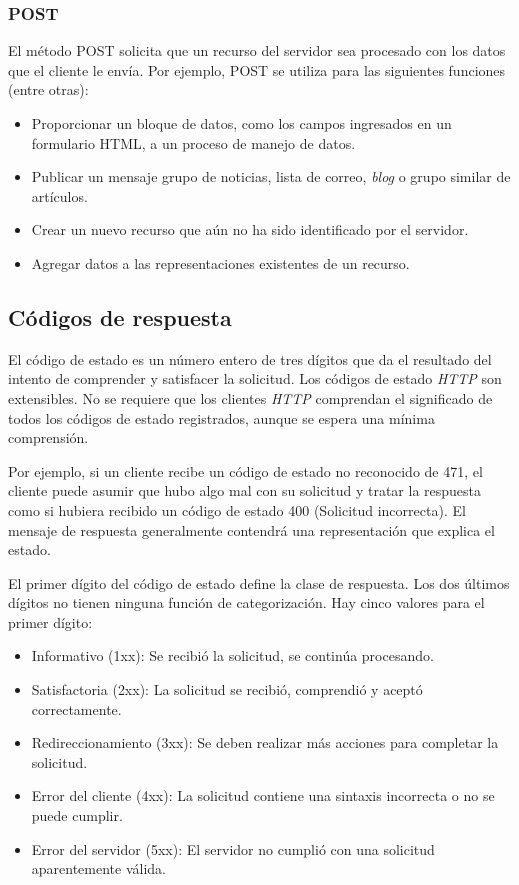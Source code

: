 \subsubsection*{POST}

El método POST solicita que un recurso del servidor sea procesado con 
los datos que el cliente le envía. Por ejemplo, POST se utiliza para 
las siguientes funciones (entre otras):

\begin{itemize}
   \setlength\itemsep{-0.6em}
   \item Proporcionar un bloque de datos, como los campos ingresados 
   en un formulario HTML, a un proceso de manejo de datos.
   \item Publicar un mensaje grupo de 
   noticias, lista de correo, \emph{blog} o grupo similar de artículos.
   \item Crear un nuevo recurso que aún no ha sido identificado por 
   el servidor.
   \item Agregar datos a las representaciones existentes de un recurso.
\end{itemize}


\subsection{Códigos de respuesta} 
El código de estado es un número entero de tres dígitos que da el 
resultado del intento de comprender y satisfacer la solicitud.
   Los códigos de estado \emph{HTTP} son extensibles. No se requiere que los
    clientes \emph{HTTP} comprendan el significado de todos los códigos de
     estado registrados, aunque se espera una mínima comprensión.

   Por ejemplo, si un cliente recibe un código de estado no reconocido
    de \textsf{471}, el cliente puede asumir que hubo algo mal con su solicitud
     y tratar la respuesta como si hubiera recibido un código de estado
     \textsf{400} (Solicitud incorrecta). El mensaje de respuesta generalmente 
      contendrá una representación que explica el estado.

   El primer dígito del código de estado define la clase de respuesta.
    Los dos últimos dígitos no tienen ninguna función de categorización.
     Hay cinco valores para el primer dígito:

   \begin{itemize}
   \setlength\itemsep{-0.6em}
      \item Informativo (\textsf{1xx}): Se recibió la solicitud, se continúa procesando.
      \item Satisfactoria (\textsf{2xx}): La solicitud se recibió, comprendió y 
      aceptó correctamente.
      \item Redireccionamiento (\textsf{3xx}): Se deben realizar más acciones para
      completar la solicitud.
      \item Error del cliente (\textsf{4xx}): La solicitud contiene una sintaxis
      incorrecta o no se puede cumplir.
      \item Error del servidor (\textsf{5xx}): El servidor no cumplió con una
      solicitud aparentemente válida.
   \end{itemize}

